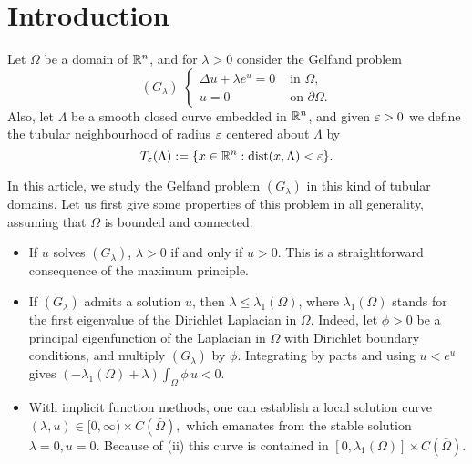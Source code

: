 
\section{Introduction}
Let $\Omega$ be a domain of $\mathbb{R}^n$, and for $\lambda>0$ consider the Gelfand 
problem
\begin{equation}
    \label{eq-g-lambda}
(G_\lambda)\;\left\{ 
    \begin{array}{cl} \Delta u + \lambda e^u=0 & \mbox{ in }\Omega,\\
        u=0 & \mbox{ on }\partial \Omega.
    \end{array}\right.
\end{equation}
Also, let $\Lambda$ be a smooth closed curve embedded in $\mathbb{R}^n$, and given
$\varepsilon>0$ we define the tubular neighbourhood of radius $\varepsilon$ centered about
$\Lambda$ by
\begin{equation}
    \label{eq-tube}
    T_\varepsilon(\Lambda):= \{x\in \mathbb{R}^n: \mbox{dist}(x,\Lambda)<\varepsilon\}.
\end{equation}

In this article, we study the Gelfand problem $(G_\lambda)$ in this kind of
tubular domains. Let us first give some properties of this problem
in all generality, assuming that $\Omega$ is
bounded and connected.

\begin{itemize}
    \item[(i)] If $u$ solves $(G_\lambda)$, $\lambda>0$ if and only if $u>0$.
        This is a straightforward consequence of the maximum principle.
    \item[(ii)] If $(G_\lambda)$ admits a solution $u$, then
        $\lambda \leq \lambda_1(\Omega)$, where $\lambda_1(\Omega)$
        stands for the first eigenvalue of the Dirichlet Laplacian in $\Omega$.
        Indeed, let $\phi>0$ be a principal eigenfunction of the Laplacian in
        $\Omega$ with Dirichlet boundary conditions, and multiply $(G_\lambda)$ by
        $\phi$. Integrating by parts and using $u<e^u$ gives
        $(-\lambda_1(\Omega)+\lambda)\int_\Omega \phi\,u < 0.$
    \item[(iii)] With implicit function methods, one can establish a local
        solution curve $(\lambda, u)\in [0,\infty)\times C(\bar\Omega),$ which
        emanates from the stable solution $\lambda=0,u=0$. Because of (ii) this
        curve is contained in $[0,\lambda_1(\Omega)]\times C(\bar\Omega)$.
\end{itemize}


